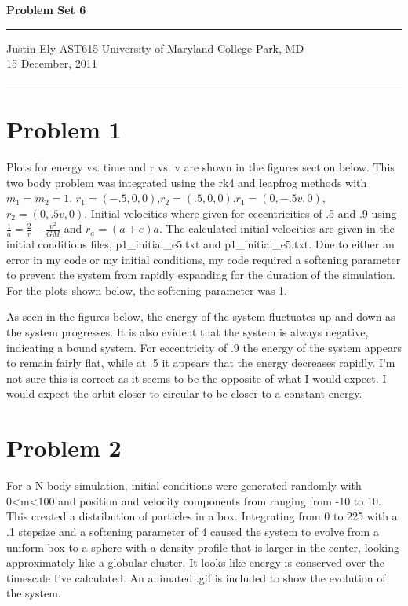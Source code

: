\documentclass[a4paper,11pt]{article}
\begin{document}
\begin{flushright}

\vspace{1.1cm}

{\bf\Huge Problem Set 6}

\rule{0.25\linewidth}{0.5pt}

\vspace{0.5cm}
Justin Ely
\linebreak
\newline
\footnotesize{AST615 University of Maryland College Park, MD\\}
\vspace{0.5cm}
15 December, 2011
\end{flushright}

\noindent\rule{\linewidth}{1.0pt}
\section*{Problem 1}
Plots for energy vs. time and r vs. v are shown in the figures section below.  This two body problem was integrated using the rk4 and leapfrog methods with $m_1=m_2=1$, $r_1=(-.5,0,0)$,$r_2=(.5,0,0)$,$r_1=(0,-.5v,0)$,$r_2=(0,.5v,0)$.  Initial velocities where given for eccentricities of .5 and .9 using $\frac{1}{a}=\frac{2}{r}-\frac{v^2}{GM}$ and $r_a=(a+e)a$.  The calculated initial velocities are given in the initial conditions files, p1\_initial\_e5.txt and p1\_initial\_e5.txt.  Due to either an error in my code or my initial conditions, my code required a softening parameter to prevent the system from rapidly expanding for the duration of the simulation.  For the plots shown below, the softening parameter was 1.  

As seen in the figures below, the energy of the system fluctuates up and down as the system progresses.  It is also evident that the system is always negative, indicating a bound system.  For eccentricity of .9 the energy of the system appears to remain fairly flat, while at .5 it appears that the energy decreases rapidly.  I'm not sure this is correct as it seems to be the opposite of what I would expect.  I would expect the orbit closer to circular to be closer to a constant energy.  


\section*{Problem 2}
For a N body simulation, initial conditions were generated randomly with 0<m<100 and position and velocity components from ranging from -10 to 10.  This created a distribution of particles in a box.  Integrating from 0 to 225 with a .1 stepsize and a softening parameter of 4 caused the system to evolve from a uniform box to a sphere with a density profile that is larger in the center, looking approximately like a globular cluster. It looks like energy is conserved over the timescale I've calculated.  An animated .gif is included to show the evolution of the system.
\end{document}
